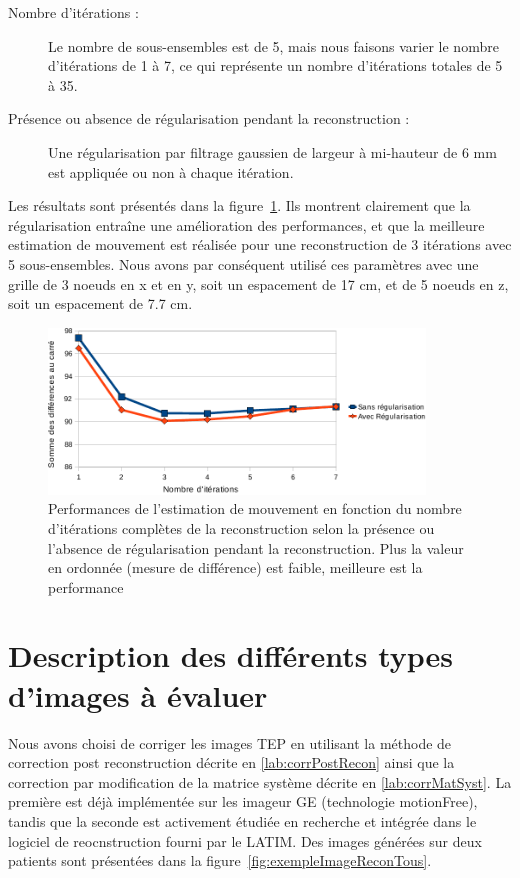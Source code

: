 \begin{description}
 \item[Nombre d'itérations :] Le nombre de sous-ensembles est de 5, mais nous faisons varier le nombre d'itérations de 1 à 7, ce qui représente un nombre d'itérations totales de 5 à 35.
 \item[Présence ou absence de régularisation pendant la reconstruction :] Une régularisation par filtrage gaussien de largeur à mi-hauteur de 6 mm est appliquée ou non à chaque itération.
\end{description}

Les résultats sont présentés dans la figure~\ref{lab:perfsFctIterReg}. Ils montrent clairement que la régularisation entraîne une amélioration des performances, et que la meilleure estimation de mouvement est réalisée pour une reconstruction de 3 itérations avec 5 sous-ensembles. Nous avons par conséquent utilisé ces paramètres avec une grille de 3 noeuds en x et en y, soit un espacement de 17 cm, et de 5 noeuds en z, soit un espacement de 7.7 cm.

\begin{figure}
\centering
\includegraphics[width=10cm]{images/perfsRecalageFctIter_crop}
\caption[Performances de l'estimation de mouvement en fonction de la régularisation]{Performances de l'estimation de mouvement en fonction du nombre d'itérations complètes de la reconstruction selon la présence ou l'absence de régularisation pendant la reconstruction. Plus la valeur en ordonnée (mesure de différence) est faible, meilleure est la performance}
\label{lab:perfsFctIterReg}
\end{figure}


\section{Description des différents types d'images à évaluer}

Nous avons choisi de corriger les images TEP en utilisant la méthode de correction post reconstruction décrite en \ref{lab:corrPostRecon} ainsi que la correction par modification de la matrice système décrite en \ref{lab:corrMatSyst}. La première est déjà implémentée sur les imageur GE (technologie motionFree), tandis que la seconde est activement étudiée en recherche et intégrée dans le logiciel de reocnstruction fourni par le LATIM. Des images générées sur deux patients sont présentées dans la figure~\ref{fig:exempleImageReconTous}.

